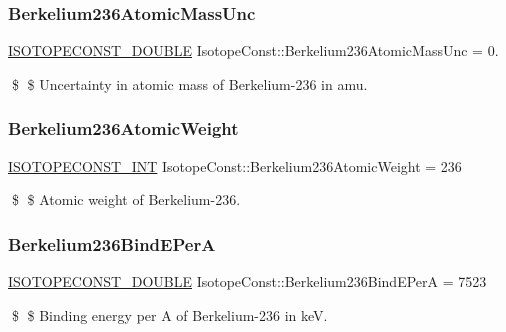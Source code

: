 \subsubsection{\texorpdfstring{Berkelium236\+Atomic\+Mass\+Unc}{Berkelium236AtomicMassUnc}}
{\footnotesize\ttfamily \mbox{\hyperlink{group___isotope_const-_macros_ga8f45a7272ce02c0b4c65c44636ed719a}{I\+S\+O\+T\+O\+P\+E\+C\+O\+N\+S\+T\+\_\+\+D\+O\+U\+B\+LE}} Isotope\+Const\+::\+Berkelium236\+Atomic\+Mass\+Unc = 0.}

\$ \$ Uncertainty in atomic mass of Berkelium-\/236 in amu. \mbox{\label{group___isotope_const-_berkelium-_bk236_gad1d6955a1eefe33dc39bb51709ea49a3}} 
\subsubsection{\texorpdfstring{Berkelium236\+Atomic\+Weight}{Berkelium236AtomicWeight}}
{\footnotesize\ttfamily \mbox{\hyperlink{group___isotope_const-_macros_ga5f18360b3e99483a35c32d789e62621c}{I\+S\+O\+T\+O\+P\+E\+C\+O\+N\+S\+T\+\_\+\+I\+NT}} Isotope\+Const\+::\+Berkelium236\+Atomic\+Weight = 236}

\$ \$ Atomic weight of Berkelium-\/236. \mbox{\label{group___isotope_const-_berkelium-_bk236_ga20a0701d9b783634ee5925f47ac46534}} 
\subsubsection{\texorpdfstring{Berkelium236\+Bind\+E\+PerA}{Berkelium236BindEPerA}}
{\footnotesize\ttfamily \mbox{\hyperlink{group___isotope_const-_macros_ga8f45a7272ce02c0b4c65c44636ed719a}{I\+S\+O\+T\+O\+P\+E\+C\+O\+N\+S\+T\+\_\+\+D\+O\+U\+B\+LE}} Isotope\+Const\+::\+Berkelium236\+Bind\+E\+PerA = 7523}

\$ \$ Binding energy per A of Berkelium-\/236 in keV. \mbox{\label{group___isotope_const-_berkelium-_bk236_gae8cf4f01adcdb300a8d826aad77d5470}} 
